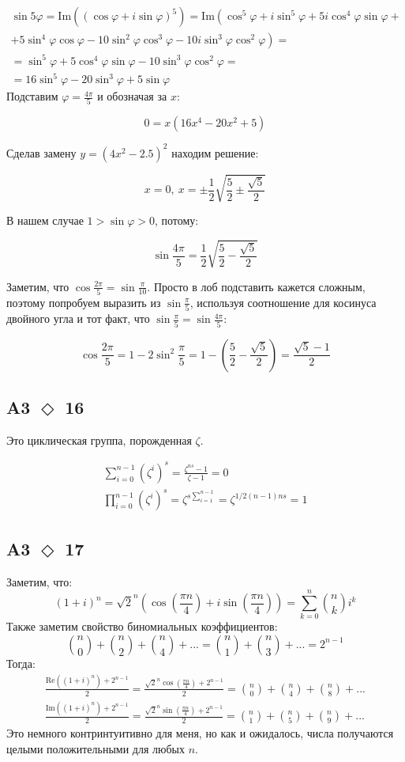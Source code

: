 \documentclass[a4paper]{article}
\renewcommand{\phi}{\varphi}
\renewcommand{\Re}[1]{\mathrm{Re}\left(#1\right)}
\renewcommand{\Im}[1]{\mathrm{Im}\left(#1\right)}
\newcommand{\task}[2]{A#1 $\Diamond$ #2}
\begin{document}
  \begin{eqnarray*}
      \sin5\phi = \Im{(\cos\phi + i\sin\phi)^5} = \mathrm{Im}\left(\cos^5\phi + i\sin^5\phi + 5i\cos^4\phi\sin\phi + \right.\\
      \left.+ 5\sin^4\phi\cos\phi - 10\sin^2\phi\cos^3\phi - 10i\sin^3\phi\cos^2\phi\right) = \\
      = \sin^5\phi + 5 \cos^4\phi\sin\phi - 10\sin^3\phi\cos^2\phi =\\
      = 16\sin^5\phi - 20\sin^3\phi + 5\sin\phi
  \end{eqnarray*}
  Подставим $\phi = \frac{4\pi}{5}$ и обозначая за $x$:

  $$0 = x(16x^4 - 20x^2 + 5)$$

  Сделав замену $y = (4x^2 - 2.5)^2$ находим решение:

  $$x = 0,\: x = \pm\frac{1}{2}\sqrt{\frac{5}{2}\pm\frac{\sqrt{5}}{2}}$$

  В нашем случае $1 > \sin \phi > 0$, потому:

  $$\sin\frac{4\pi}{5} = \frac{1}{2}\sqrt{\frac{5}{2} - \frac{\sqrt{5}}{2}}$$

  Заметим, что $\cos\frac{2\pi}{5} = \sin\frac{\pi}{10}$. Просто в лоб подставить кажется сложным, поэтому попробуем выразить из $\sin\frac{\pi}{5}$, используя соотношение для косинуса двойного угла и тот факт, что $\sin\frac{\pi}{5} =  \sin\frac{4\pi}{5}$:

  $$\cos\frac{2\pi}{5} = 1 - 2\sin^2\frac{\pi}{5} = 1 - \left(\frac{5}{2} - \frac{\sqrt{5}}{2}\right) = \frac{\sqrt{5} - 1}{2}$$ 


  \subsection*{\task{3}{16}}
  Это циклическая группа, порожденная $\zeta$.

  \begin{eqnarray*}
      \sum_{i=0}^{n - 1} (\zeta^i)^s = \frac{\zeta^{ns} - 1}{\zeta - 1} = 0\\
      \prod_{i=0}^{n - 1} (\zeta^i)^s = \zeta^{s\sum_{i = 1}^{n - 1}} = \zeta^{1/2 (n - 1) n s} = 1
  \end{eqnarray*}
  \subsection*{\task{3}{17}}
  Заметим, что:
  $$(1 + i)^n = \sqrt{2}^n\left(\cos\left(\frac{\pi n}{4}\right) + i\sin\left(\frac{\pi n}{4}\right)\right) = \sum_{k=0}^n \binom{n}{k} i^k$$
  Также заметим свойство биномиальных коэффициентов:
  $$\binom{n}{0} + \binom{n}{2} + \binom{n}{4} + ... = \binom{n}{1} + \binom{n}{3} + ... = 2^{n - 1}$$
  Тогда:
  \begin{eqnarray*}
       \frac{\Re{(1 + i)^n}+ 2^{n - 1}}{2} = \frac{\sqrt{2}^n\cos\left(\frac{\pi n}{4}\right) + 2^{n - 1}}{2} = \binom{n}{0} + \binom{n}{4} + \binom{n}{8} + ...\\
       \frac{\Im{(1 + i)^n}+ 2^{n - 1}}{2} = \frac{\sqrt{2}^n\sin\left(\frac{\pi n}{4}\right) + 2^{n - 1}}{2} = \binom{n}{1} + \binom{n}{5} + \binom{n}{9} + ...
  \end{eqnarray*}
  Это немного контринтуитивно для меня, но как и ожидалось, числа получаются целыми положительными для любых $n$.
\end{document}

